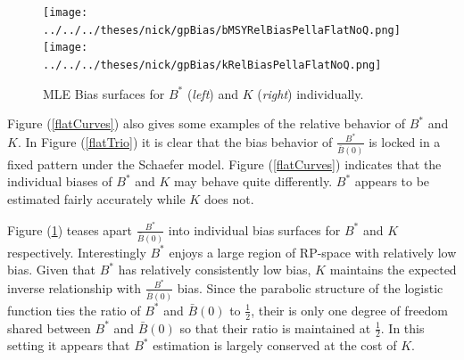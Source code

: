 \documentclass[12pt]{article}
\begin{document}
{%
\clearpage
\begin{figure}[h!]
\texttt{[image: ../../../theses/nick/gpBias/bMSYRelBiasPellaFlatNoQ.png]}
\texttt{[image: ../../../theses/nick/gpBias/kRelBiasPellaFlatNoQ.png]}
\caption{\label{flatRat}
MLE Bias surfaces for $B^*$ (\emph{left}) and $K$ (\emph{right}) individually.
}
\end{figure}

Figure (\ref{flatCurves}) also gives some examples of the relative behavior of 
$B^*$ and $K$. In Figure (\ref{flatTrio}) it is clear that the bias behavior of 
$\frac{B^*}{\bar B(0)}$ is locked in a fixed pattern under the Schaefer model. 
Figure (\ref{flatCurves}) indicates that the individual biases of $B^*$ and $K$ 
may behave quite differently. $B^*$ appears to be estimated fairly accurately 
while $K$ does not.

%
Figure (\ref{flatRat}) teases apart $\frac{B^*}{\bar B(0)}$ into individual bias 
surfaces for $B^*$ and $K$ respectively. Interestingly $B^*$ enjoys a large region 
of RP-space with relatively low bias. Given that $B^*$ has relatively consistently
low bias, $K$ maintains the expected inverse relationship with $\frac{B^*}{\bar B(0)}$ 
bias. Since the parabolic structure of the logistic function ties the ratio of 
$B^*$ and $\bar B(0)$ to $\frac{1}{2}$, their is only one degree of freedom 
shared between $B^*$ and $\bar B(0)$ so that their ratio is maintained at $\frac{1}{2}$. 
In this setting it appears that $B^*$ estimation is largely conserved at the 
cost of $K$.



}
\end{document}
